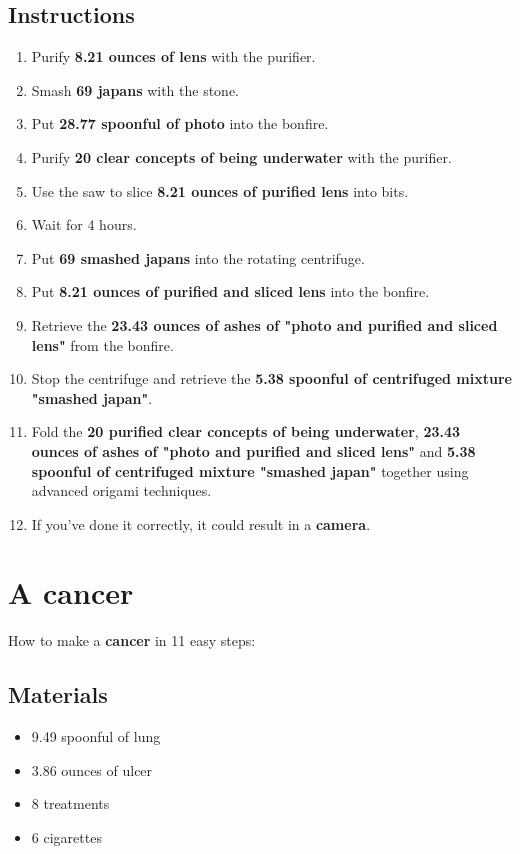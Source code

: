 \documentclass{article}
\begin{document}
\subsection{Instructions}\begin{enumerate}
\item 
Purify \textbf{8.21 ounces of lens} with the purifier.
\item 
Smash \textbf{69 japans} with the stone.
\item 
Put \textbf{28.77 spoonful of photo} into the bonfire.
\item 
Purify \textbf{20 clear concepts of being underwater} with the purifier.
\item 
Use the saw to slice \textbf{8.21 ounces of purified lens} into bits.
\item 
Wait for 4 hours.
\item 
Put \textbf{69 smashed japans} into the rotating centrifuge.
\item 
Put \textbf{8.21 ounces of purified and sliced lens} into the bonfire.
\item 
Retrieve the \textbf{23.43 ounces of ashes of "photo and purified and sliced lens"} from the bonfire.
\item 
Stop the centrifuge and retrieve the \textbf{5.38 spoonful of centrifuged mixture "smashed japan"}.
\item 
Fold the \textbf{20 purified clear concepts of being underwater}, \textbf{23.43 ounces of ashes of "photo and purified and sliced lens"} and \textbf{5.38 spoonful of centrifuged mixture "smashed japan"} together using advanced origami techniques.
\item 
If you've done it correctly, it could result in a \textbf{camera}.
\end{enumerate}
\newpage
\section{A cancer}How to make a \textbf{cancer} in 11 easy steps:

\subsection{Materials}\begin{itemize}
\item 
9.49 spoonful of lung
\item 
3.86 ounces of ulcer
\item 
8 treatments
\item 
6 cigarettes
\end{itemize}
\end{document}
